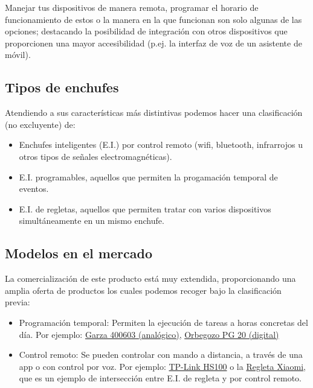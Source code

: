 \documentclass[a4paper,10pt]{article}
\begin{document}
Manejar tus dispositivos de manera remota, programar el horario de
funcionamiento de estos o la manera en la que funcionan son solo algunas
de las opciones; destacando la posibilidad de integración con otros
dispositivos que proporcionen una mayor accesibilidad (p.ej. la interfaz
de voz de un asistente de móvil).

\subsection{Tipos de enchufes}\label{tipos-de-enchufes}

Atendiendo a sus características más distintivas podemos hacer una
clasificación (no excluyente) de:

\begin{itemize}
\item
  Enchufes inteligentes (E.I.) por control remoto (wifi, bluetooth,
  infrarrojos u otros tipos de señales electromagnéticas).
\item
  E.I. programables, aquellos que permiten la progamación temporal de eventos.
\item
  E.I. de regletas, aquellos que permiten tratar con varios
  dispositivos simultáneamente en un mismo enchufe.
\end{itemize}

\subsection{Modelos en el mercado}\label{modelos-en-el-mercado}

La comercialización de este producto está muy extendida, proporcionando
una amplia oferta de productos los cuales podemos recoger bajo la
clasificación previa:

\begin{itemize}
\item
  Programación temporal: Permiten la ejecución de tareas a horas
  concretas del día. Por ejemplo:
  \href{https://web.archive.org/web/20191111121153/https://www.amazon.es/Garza-Power-Temporizador-anal\%C3\%B3gico-programaci\%C3\%B3n/dp/B00URUVDW2/}{Garza
  400603 (analógico)},
  \href{https://web.archive.org/web/20191112121450/https://www.amazon.es/dp/B00ZJ1LQDK}{Orbegozo
  PG 20 (digital)}
\item
  Control remoto: Se pueden controlar con mando a distancia, a través de
  una app o con control por voz. Por ejemplo:
  \href{https://web.archive.org/web/20191112130933/https://www.amazon.es/dp/B06W586CDZ}{TP-Link
  HS100} o la
  \href{https://web.archive.org/web/20191116174434/https://www.amazon.es/dp/B07DJ2G1CW}{Regleta
  Xiaomi}, que es un ejemplo de intersección entre E.I. de regleta y por
  control remoto.
\end{itemize}
\end{document}

